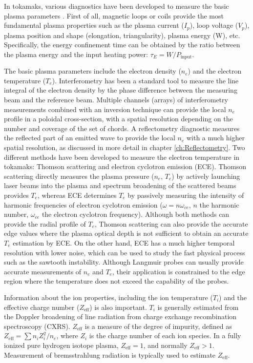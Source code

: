 In tokamaks, various diagnostics have been developed to measure the basic plasma parameters \cite{Hutchinson_2002_Diagnostics,Wesson_1997_Tokamaks}. First of all, magnetic loops or coils provide the most fundamental plasma properties such as the plasma current ($I_p$), loop voltage ($V_p$), plasma position and shape (elongation, triangularity), plasma energy (W), etc. Specifically, the energy confinement time can be obtained by the ratio between the plasma energy and the input heating power: $\tau_E = W/P_\mathrm{input}$.

The basic plasma parameters include the electron density ($n_e$) and the electron temperature ($T_e$). Interferometry has been a standard tool to measure the line integral of the electron density by the phase difference between the measuring beam and the reference beam. Multiple channels (arrays) of interferometry measurements combined with an inversion technique can provide the local $n_e$ profile in a poloidal cross-section, with a spatial resolution depending on the number and coverage of the set of chords. A reflectometry diagnostic measures the reflected part of an emitted wave to provide the local $n_e$ with a much higher spatial resolution, as discussed in more detail in chapter \ref{ch:Reflectometry}. Two different methods have been developed to measure the electron temperature in tokamaks: Thomson scattering and electron cyclotron emission (ECE). Thomson scattering directly measures the plasma pressure ($n_e$, $T_e$) by actively launching laser beams into the plasma and spectrum broadening of the scattered beams provides $T_e$, whereas ECE determines $T_e$ by passively measuring the intensity of harmonic frequencies of electron cyclotron emission ($\omega = n\omega_{ce}$, $n$ the harmonic number, $\omega_{ce}$ the electron cyclotron frequency). Although both methods can provide the radial profile of $T_e$, Thomson scattering can also provide the accurate edge values where the plasma optical depth is not sufficient to obtain an accurate $T_e$ estimation by ECE. On the other hand, ECE has a much higher temporal resolution with lower noise, which can be used to study the fast physical process such as the sawtooth instability. Although Langmuir probes can usually provide accurate measurements of $n_e$ and $T_e$, their application is constrained to the edge region where the temperature does not exceed the capability of the probes.

Information about the ion properties, including the ion temperature ($T_i$) and the effective charge number ($Z_\mathrm{eff}$) is also important. $T_i$ is generally estimated from the Doppler broadening of line radiation from charge exchange recombination spectroscopy (CXRS). $Z_\mathrm{eff}$ is a measure of the degree of impurity, defined as $Z_\mathrm{eff} = \sum n_iZ_i^2/n_e$, where $Z_i$ is the charge number of each ion species. In a fully ionized pure hydrogen isotope plasma, $Z_\mathrm{eff} = 1$, and normally $Z_\mathrm{eff} > 1$. Measurement of bremsstrahlung radiation is typically used to estimate $Z_\mathrm{eff}$.


